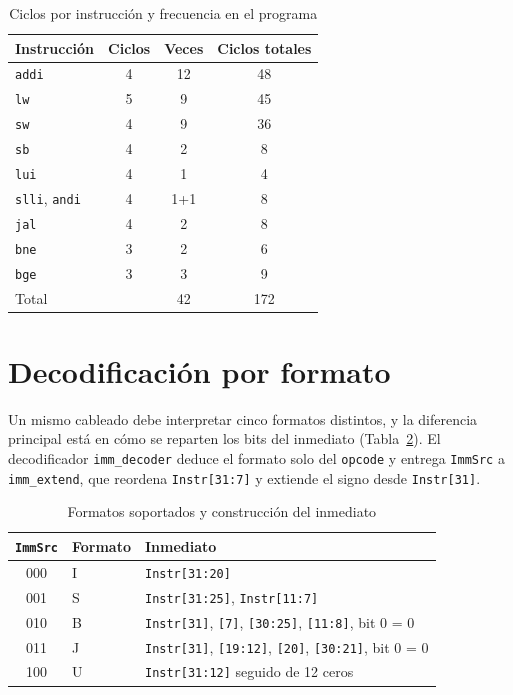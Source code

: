 \documentclass[conference]{IEEEtran}
\newcommand{\cod}[1]{\texttt{\small #1}}
\begin{document}
\begin{table}[t]
\caption{Ciclos por instrucción y frecuencia en el programa}\label{tab:cpi}
\centering\footnotesize
\begin{tabular}{@{}lccc@{}}\toprule
Instrucción & Ciclos & Veces & Ciclos totales\\\midrule
\cod{addi} & 4 & 12 & 48\\
\cod{lw} & 5 & 9 & 45\\
\cod{sw} & 4 & 9 & 36\\
\cod{sb} & 4 & 2 & 8\\
\cod{lui} & 4 & 1 & 4\\
\cod{slli}, \cod{andi} & 4 & 1+1 & 8\\
\cod{jal} & 4 & 2 & 8\\
\cod{bne} & 3 & 2 & 6\\
\cod{bge} & 3 & 3 & 9\\\midrule
Total & & 42 & 172\\\bottomrule
\end{tabular}
\end{table}

\section{Decodificación por formato}
Un mismo cableado debe interpretar cinco formatos distintos, y la diferencia principal está en cómo se reparten los bits del inmediato (Tabla~\ref{tab:fmt}). El decodificador \cod{imm\_decoder} deduce el formato solo del \cod{opcode} y entrega \cod{ImmSrc} a \cod{imm\_extend}, que reordena \cod{Instr[31:7]} y extiende el signo desde \cod{Instr[31]}.

\begin{table}[t]
\caption{Formatos soportados y construcción del inmediato}\label{tab:fmt}
\centering\footnotesize
\setlength{\tabcolsep}{2.5pt}\begin{tabular}{@{}clp{4.3cm}@{}}\toprule
\cod{ImmSrc} & Formato & Inmediato\\\midrule
000 & I & \cod{Instr[31:20]}\\
001 & S & \cod{Instr[31:25]}, \cod{Instr[11:7]}\\
010 & B & \cod{Instr[31]}, \cod{[7]}, \cod{[30:25]}, \cod{[11:8]}, bit 0 = 0\\
011 & J & \cod{Instr[31]}, \cod{[19:12]}, \cod{[20]}, \cod{[30:21]}, bit 0 = 0\\
100 & U & \cod{Instr[31:12]} seguido de 12 ceros\\\bottomrule
\end{tabular}
\end{table}
\end{document}
